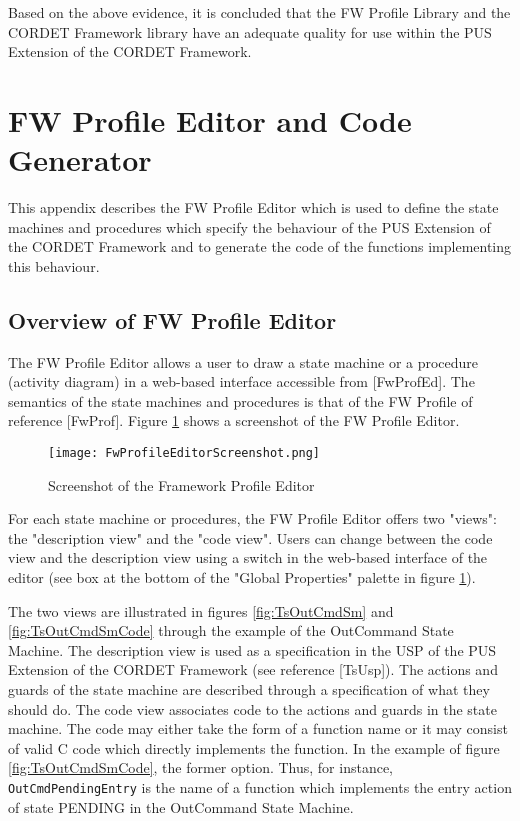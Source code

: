 \documentclass{pnp_article}
\begin{document}
Based on the above evidence, it is concluded that the FW Profile Library and the CORDET Framework library have an adequate quality for use within the PUS Extension of the CORDET Framework.




\newpage
\appendix
\section{FW Profile Editor and Code Generator}\label{sec:svrFwProfEd}
This appendix describes the FW Profile Editor which is used to define the state machines and procedures which specify the behaviour of the PUS Extension of the CORDET Framework and to generate the code of the functions implementing this behaviour.

\subsection{Overview of FW Profile Editor}
The FW Profile Editor allows a user to draw a state machine or a procedure (activity diagram) in a web-based interface accessible from [FwProfEd]. The semantics of the state machines and procedures is that of the FW Profile of reference [FwProf]. Figure \ref{fig:FwProfileEditorScreenshot} shows a screenshot of the FW Profile Editor.

\begin{figure}[htbp]
 \centering
 \texttt{[image: FwProfileEditorScreenshot.png]}
 \caption{Screenshot of the Framework Profile Editor}
 \label{fig:FwProfileEditorScreenshot}
\end{figure}

For each state machine or procedures, the FW Profile Editor offers two "views": the "description view" and the "code view". Users can change between the code view and the description view using a switch in the web-based interface of the editor (see box at the bottom of the "Global Properties" palette in figure \ref{fig:FwProfileEditorScreenshot}).

The two views are illustrated in figures \ref{fig:TsOutCmdSm} and \ref{fig:TsOutCmdSmCode} through the example of the OutCommand State Machine. The description view is used as a specification in the USP of the PUS Extension of the CORDET Framework (see reference [TsUsp]). The actions and guards of the state machine are described through a specification of what they should do. The code view associates code to the actions and guards in the state machine. The code may either take the form of a function name or it may consist of valid C code which directly implements the function. In the example of figure \ref{fig:TsOutCmdSmCode}, the former option. Thus, for instance, \texttt{OutCmdPendingEntry} is the name of a function which implements the entry action of state PENDING in the OutCommand State Machine.
\end{document}
